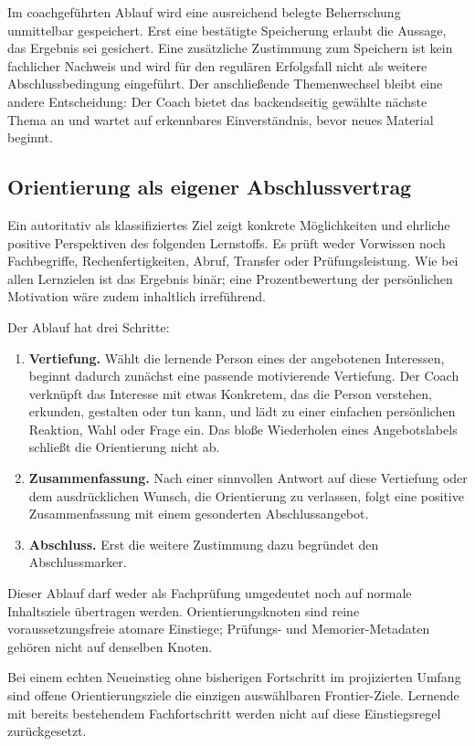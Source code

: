 Im coachgeführten Ablauf wird eine ausreichend belegte Beherrschung
unmittelbar gespeichert. Erst eine bestätigte Speicherung erlaubt
die Aussage, das Ergebnis sei gesichert. Eine zusätzliche Zustimmung
zum Speichern ist kein fachlicher Nachweis und wird für den regulären
Erfolgsfall nicht als weitere Abschlussbedingung eingeführt.
Der anschließende Themenwechsel bleibt eine andere Entscheidung:
Der Coach bietet das backendseitig gewählte nächste Thema an und wartet
auf erkennbares Einverständnis, bevor neues Material beginnt.

\subsection{Orientierung als eigener Abschlussvertrag}
\label{sec:orientation}

Ein autoritativ als  klassifiziertes Ziel zeigt
konkrete Möglichkeiten und ehrliche positive Perspektiven des
folgenden Lernstoffs. Es prüft weder Vorwissen noch Fachbegriffe,
Rechenfertigkeiten, Abruf, Transfer oder Prüfungsleistung. Wie bei allen
Lernzielen ist das Ergebnis binär; eine Prozentbewertung der persönlichen
Motivation wäre zudem inhaltlich irreführend.

Der Ablauf hat drei Schritte:
\begin{enumerate}
\item \textbf{Vertiefung.} Wählt die lernende Person eines der angebotenen
 Interessen, beginnt dadurch zunächst eine passende motivierende
 Vertiefung. Der Coach verknüpft das Interesse mit etwas Konkretem, das
 die Person verstehen, erkunden, gestalten oder tun kann, und lädt zu
 einer einfachen persönlichen Reaktion, Wahl oder Frage ein. Das bloße
 Wiederholen eines Angebotslabels schließt die Orientierung nicht ab.
\item \textbf{Zusammenfassung.} Nach einer sinnvollen Antwort auf diese
 Vertiefung oder dem ausdrücklichen Wunsch, die Orientierung zu
 verlassen, folgt eine positive Zusammenfassung mit einem gesonderten
 Abschlussangebot.
\item \textbf{Abschluss.} Erst die weitere Zustimmung dazu begründet den
 Abschlussmarker.
\end{enumerate}
Dieser Ablauf darf weder als Fachprüfung umgedeutet noch auf normale
Inhaltsziele übertragen werden. Orientierungsknoten sind reine
voraussetzungsfreie atomare Einstiege; Prüfungs- und Memorier-Metadaten
gehören nicht auf denselben Knoten.

Bei einem echten Neueinstieg ohne bisherigen Fortschritt im projizierten
Umfang sind offene Orientierungsziele die einzigen auswählbaren Frontier-Ziele.
Lernende mit bereits bestehendem Fachfortschritt werden nicht auf diese
Einstiegsregel zurückgesetzt.

